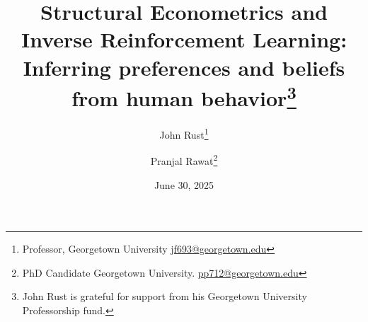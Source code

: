 \documentclass[11pt]{article}
\title{ \vspace*{1cm} \hspace*{-0.5cm}Structural Econometrics and Inverse Reinforcement Learning:\\
Inferring preferences and beliefs from human behavior\footnote{John Rust is grateful for support
from his Georgetown University Professorship fund.
}}
\author{John Rust\thanks{Professor, Georgetown University
\href{mailto:jf693@georgetown.edu}{jf693@georgetown.edu}} \and Pranjal Rawat\thanks{PhD Candidate Georgetown University.  \href{mailto:pp712@georgetown.edu}{pp712@georgetown.edu}}}
\date{ \vspace*{0.5cm} June 30, 2025 \\ \bigskip {\Large PRELIMINARY DRAFT: NOT FOR CIRCULATION} }
\begin{document}
\bgroup
\let\footnoterule\relax

\maketitle


\thispagestyle{empty}

\clearpage
\egroup
\setcounter{page}{1}















\clearpage
\begin{singlespace}
%
%


\end{singlespace}



% 
% 
\end{document}
